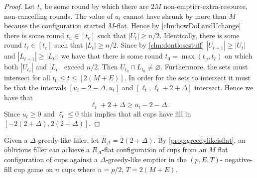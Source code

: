 \begin{proof}
  Let $t_e$ be some round by which there are $2M$
  non-emptier-extra-resource, non-cancelling rounds. The value of
  $u_t$ cannot have shrunk by more than $M$ because the
  configuration started $M$-flat. Hence by
  \cref{clm:howDoLandUchange} there is some round $t_u \in [t_e]$
  such that $|U_t|\ge n/2$. Identically, there is some round
  $t_\ell \in [t_e]$ such that $|L_t| \ge n/2$. Since by
  \cref{clm:dontlosestuff} $|U_{t+1}|\ge |U_t|$ and $|L_{t+1}|
  \ge |L_t|$, we have that there is some round $t_0 =\max(t_u,
  t_\ell)$ on which both $|U_{t_0}|$ and $|L_{t_0}|$ exceed
  $n/2$. Then $U_{t_0} \cap L_{t_0} \neq \varnothing$.
  Furthermore, the sets must intersect for all $t_0 \le t \le
  [2(M+E)]$. In order for the sets to intersect it must be that
  the intervals $[u_t-2-\Delta, u_t]$ and $[\ell_t,
  \ell_t+2+\Delta]$ intersect. Hence we have that
  $$\ell_t+2+\Delta \ge u_t-2-\Delta.$$ Since $u_t \ge 0$ and
  $\ell_t \le 0$ this implies that all cups have fill in
  $[-2(2+\Delta), 2(2+\Delta)]$.

\end{proof}

Given a $\Delta$-greedy-like filler, let $R_\Delta = 2(2+\Delta).$
By \cref{prop:greedylikeisflat}, an oblivious filler can achieve
a $R_\Delta$-flat configuration of cups from an $M$ flat
configuration of cups against a $\Delta$-greedy-like emptier in
the $(p, E, T)$- negative-fill cup game on
$n$ cups where $n = p/2$, $T = 2(M + E)$.


